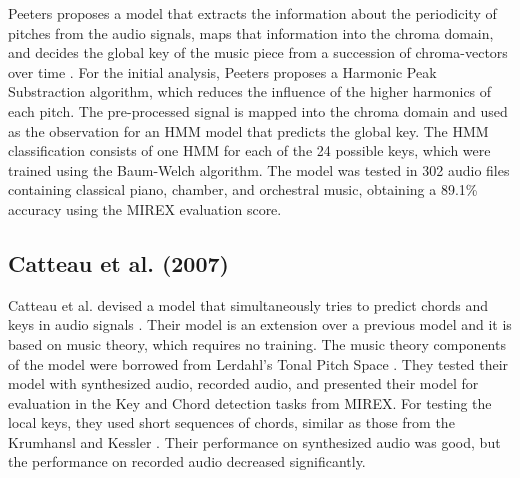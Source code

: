 Peeters proposes a model that extracts the information about the periodicity of pitches from the audio signals, maps that information into the chroma domain, and decides the global key of the music piece from a succession of chroma-vectors over time \cite{peeters_chroma-based_2006}. For the initial analysis, Peeters proposes a Harmonic Peak Substraction algorithm, which reduces the influence of the higher harmonics of each pitch. The pre-processed signal is mapped into the chroma domain and used as the observation for an HMM model that predicts the global key. The HMM classification consists of one HMM for each of the 24 possible keys, which were trained using the Baum-Welch algorithm. The model was tested in 302 audio files containing classical piano, chamber, and orchestral music, obtaining a 89.1\% accuracy using the MIREX evaluation score.



\subsection{Catteau et al. (2007)}
Catteau et al. devised a model that simultaneously tries to predict chords and keys in audio signals \cite{catteau_probabilistic_2007}. Their model is an extension over a previous model \cite{bello_robust_2005} and it is based on music theory, which requires no training. The music theory components of the model were borrowed from Lerdahl's Tonal Pitch Space \cite{lerdahl_tonal_2005}. They tested their model with synthesized audio, recorded audio, and presented their model for evaluation in the Key and Chord detection tasks from MIREX. For testing the local keys, they used short sequences of chords, similar as those from the Krumhansl and Kessler \cite{krumhansl_tracing_1982}. Their performance on synthesized audio was good, but the performance on recorded audio decreased significantly.


